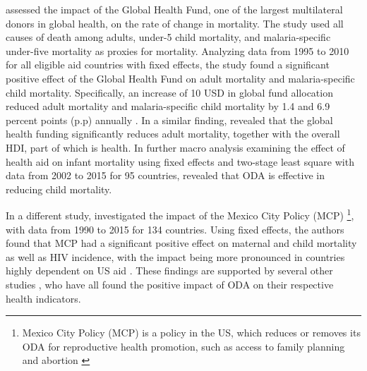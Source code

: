 \textcite{yan_mortality_2015} assessed the impact of the Global Health Fund, one of the largest multilateral donors in global health, on the rate of change in mortality. The study used all causes of death among adults, under-5 child mortality, and malaria-specific under-five mortality as proxies for mortality. Analyzing data from 1995 to 2010 for all eligible aid countries with fixed effects, the study found a significant positive effect of the Global Health Fund on adult mortality and malaria-specific child mortality. Specifically, an increase of 10 USD in global fund allocation reduced adult mortality and malaria-specific child mortality by 1.4 and 6.9 percent points (p.p) annually \parencite{yan_mortality_2015}. In a similar finding, \textcite{kavanagh_governance_2019} revealed that the global health funding significantly reduces adult mortality, together with the overall HDI, part of which is health. In further macro analysis examining the effect of health aid on infant mortality using fixed effects and two-stage least square with data from 2002 to 2015 for 95 countries, \textcite{doucouliagos_health_2021} revealed that ODA is effective in reducing child mortality.

In a different study, \textcite{kavakli_us_2022} investigated the impact of the Mexico City Policy (MCP) \footnote{Mexico City Policy (MCP) is a policy in the US, which reduces or removes its ODA for reproductive health promotion, such as access to family planning and abortion \parencite{kavakli_us_2022}}, with data from 1990 to 2015 for 134 countries. Using fixed effects, the authors found that MCP had a significant positive effect on maternal and child mortality as well as HIV incidence, with the impact being more pronounced in countries highly dependent on US aid \parencite{kavakli_us_2022}. These findings are supported by several other studies \parencite{akinola_foreign_2022, mohamed_foreign_2017, muhammad_health_2021, yogo_health_2015}, who have all found the positive impact of ODA on their respective health indicators.

